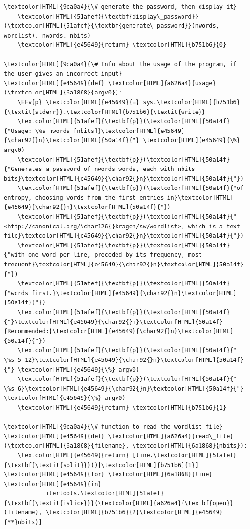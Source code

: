 \documentclass{scrartcl}
\newcommand{\EFv}[1]{\textcolor{EFv}{#1}} %
\begin{document}
\begin{Code}
\begin{Verbatim}[]
    \textcolor[HTML]{9ca0a4}{\# generate the password, then display it}
    \textcolor[HTML]{51afef}{\textbf{display\_password}}(\textcolor[HTML]{51afef}{\textbf{generate\_password}}(nwords, wordlist), nwords, nbits)
    \textcolor[HTML]{e45649}{return} \textcolor[HTML]{b751b6}{0}

\textcolor[HTML]{9ca0a4}{\# Info about the usage of the program, if the user gives an incorrect input}
\textcolor[HTML]{e45649}{def} \textcolor[HTML]{a626a4}{usage}(\textcolor[HTML]{6a1868}{argv0}):
    \EFv{p} \textcolor[HTML]{e45649}{=} sys.\textcolor[HTML]{b751b6}{\textit{stderr}}.\textcolor[HTML]{b751b6}{\textit{write}}
    \textcolor[HTML]{51afef}{\textbf{p}}(\textcolor[HTML]{50a14f}{"Usage: \%s nwords [nbits]}\textcolor[HTML]{e45649}{\char92{}n}\textcolor[HTML]{50a14f}{"} \textcolor[HTML]{e45649}{\%} argv0)
    \textcolor[HTML]{51afef}{\textbf{p}}(\textcolor[HTML]{50a14f}{"Generates a password of nwords words, each with nbits bits}\textcolor[HTML]{e45649}{\char92{}n}\textcolor[HTML]{50a14f}{"})
    \textcolor[HTML]{51afef}{\textbf{p}}(\textcolor[HTML]{50a14f}{"of entropy, choosing words from the first entries in}\textcolor[HTML]{e45649}{\char92{}n}\textcolor[HTML]{50a14f}{"})
    \textcolor[HTML]{51afef}{\textbf{p}}(\textcolor[HTML]{50a14f}{"<http://canonical.org/\char126{}kragen/sw/wordlist>, which is a text file}\textcolor[HTML]{e45649}{\char92{}n}\textcolor[HTML]{50a14f}{"})
    \textcolor[HTML]{51afef}{\textbf{p}}(\textcolor[HTML]{50a14f}{"with one word per line, preceded by its frequency, most frequent}\textcolor[HTML]{e45649}{\char92{}n}\textcolor[HTML]{50a14f}{"})
    \textcolor[HTML]{51afef}{\textbf{p}}(\textcolor[HTML]{50a14f}{"words first.}\textcolor[HTML]{e45649}{\char92{}n}\textcolor[HTML]{50a14f}{"})
    \textcolor[HTML]{51afef}{\textbf{p}}(\textcolor[HTML]{50a14f}{"}\textcolor[HTML]{e45649}{\char92{}n}\textcolor[HTML]{50a14f}{Recommended:}\textcolor[HTML]{e45649}{\char92{}n}\textcolor[HTML]{50a14f}{"})
    \textcolor[HTML]{51afef}{\textbf{p}}(\textcolor[HTML]{50a14f}{"    \%s 5 12}\textcolor[HTML]{e45649}{\char92{}n}\textcolor[HTML]{50a14f}{"} \textcolor[HTML]{e45649}{\%} argv0)
    \textcolor[HTML]{51afef}{\textbf{p}}(\textcolor[HTML]{50a14f}{"    \%s 6}\textcolor[HTML]{e45649}{\char92{}n}\textcolor[HTML]{50a14f}{"} \textcolor[HTML]{e45649}{\%} argv0)
    \textcolor[HTML]{e45649}{return} \textcolor[HTML]{b751b6}{1}

\textcolor[HTML]{9ca0a4}{\# function to read the wordlist file}
\textcolor[HTML]{e45649}{def} \textcolor[HTML]{a626a4}{read\_file}(\textcolor[HTML]{6a1868}{filename}, \textcolor[HTML]{6a1868}{nbits}):
    \textcolor[HTML]{e45649}{return} [line.\textcolor[HTML]{51afef}{\textbf{\textit{split}}}()[\textcolor[HTML]{b751b6}{1}] \textcolor[HTML]{e45649}{for} \textcolor[HTML]{6a1868}{line} \textcolor[HTML]{e45649}{in}
            itertools.\textcolor[HTML]{51afef}{\textbf{\textit{islice}}}(\textcolor[HTML]{a626a4}{\textbf{open}}(filename), \textcolor[HTML]{b751b6}{2}\textcolor[HTML]{e45649}{**}nbits)]


\end{Verbatim}
\end{Code}
\end{document}
